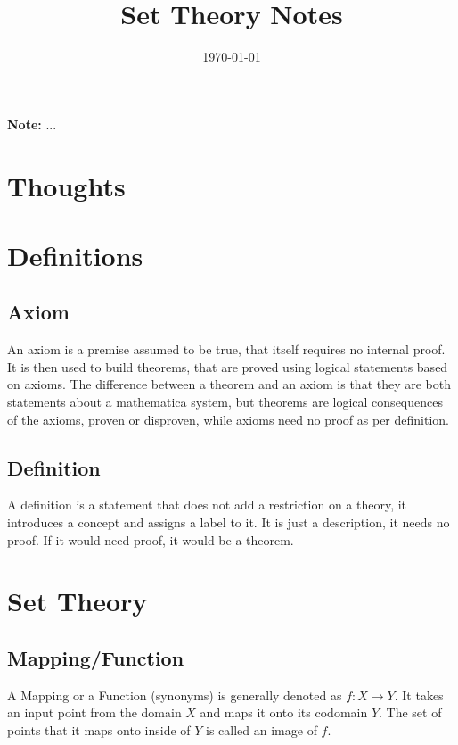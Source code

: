 \documentclass[11pt,a4paper]{article}
\title{Set Theory Notes}
\date{\today}
\newcommand{\note}[1]{%
  \par\medskip
  \noindent\textbf{Note:} #1
  \par\medskip
}
\begin{document}
\maketitle
\tableofcontents
\tableofcontents

\note{
...
}

\section{Thoughts}

\section{Definitions}

\subsection{Axiom}

An axiom is a premise assumed to be true, that itself requires no internal proof.
It is then used to build theorems, that are proved using logical statements based
on axioms. The difference between a theorem and an axiom is that they are both
statements about a mathematica system, but theorems are logical consequences
of the axioms, proven or disproven, while axioms need no proof as per definition.

\subsection{Definition}

A definition is a statement that does not add a restriction on a theory, it
introduces a concept and assigns a label to it. It is just a description, it needs
no proof. If it would need proof, it would be a theorem.

\section{Set Theory}

\subsection{Mapping/Function}

A Mapping or a Function (synonyms) is generally denoted as $f: X \to Y$. It takes an
input point from the domain $X$ and maps it onto its codomain $Y$. The set of points
that it maps onto inside of $Y$ is called an image of $f$.
\end{document}
